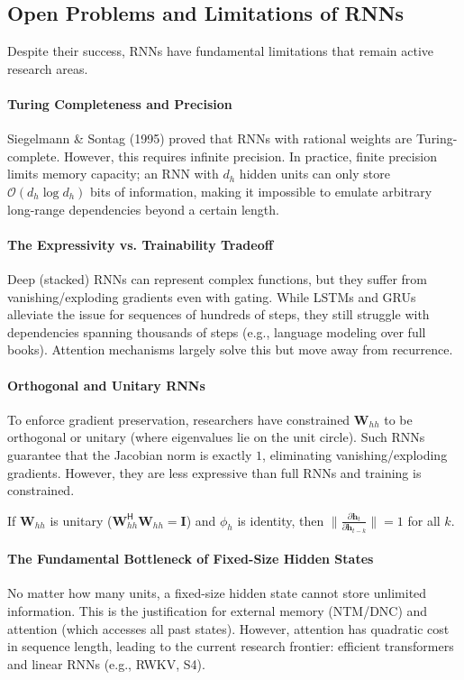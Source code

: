 \documentclass{tufte-handout}
\begin{document}
\subsection{Open Problems and Limitations of RNNs}

Despite their success, RNNs have fundamental limitations that remain active research areas.

\paragraph{Turing Completeness and Precision}
Siegelmann \& Sontag (1995) proved that RNNs with rational weights are Turing-complete. However, this requires infinite precision. In practice, finite precision limits memory capacity; an RNN with $d_h$ hidden units can only store $\mathcal{O}(d_h \log d_h)$ bits of information, making it impossible to emulate arbitrary long-range dependencies beyond a certain length.

\paragraph{The Expressivity vs. Trainability Tradeoff}
Deep (stacked) RNNs can represent complex functions, but they suffer from vanishing/exploding gradients even with gating. While LSTMs and GRUs alleviate the issue for sequences of hundreds of steps, they still struggle with dependencies spanning thousands of steps (e.g., language modeling over full books). Attention mechanisms largely solve this but move away from recurrence.

\paragraph{Orthogonal and Unitary RNNs}
To enforce gradient preservation, researchers have constrained $\mathbf{W}_{hh}$ to be orthogonal or unitary (where eigenvalues lie on the unit circle). Such RNNs guarantee that the Jacobian norm is exactly $1$, eliminating vanishing/exploding gradients. However, they are less expressive than full RNNs and training is constrained.

\begin{thm}
    If $\mathbf{W}_{hh}$ is unitary ($\mathbf{W}_{hh}^{\mathsf{H}} \mathbf{W}_{hh} = \mathbf{I}$) and $\phi_h$ is identity, then $\|\frac{\partial \mathbf{h}_t}{\partial \mathbf{h}_{t-k}}\| = 1$ for all $k$.
\end{thm}

\paragraph{The Fundamental Bottleneck of Fixed-Size Hidden States}
No matter how many units, a fixed-size hidden state cannot store unlimited information. This is the justification for external memory (NTM/DNC) and attention (which accesses all past states). However, attention has quadratic cost in sequence length, leading to the current research frontier: efficient transformers and linear RNNs (e.g., RWKV, S4).
\end{document}
